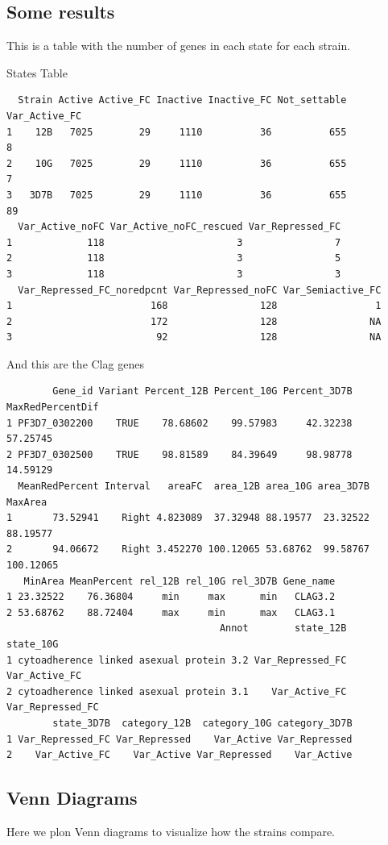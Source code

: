 \documentclass[11pt]{article}
\begin{document}
\subsection{Some results}
\label{sec:orgee930da}
This is a table with the number of genes in each state for each strain.

States Table
\begin{verbatim}
  Strain Active Active_FC Inactive Inactive_FC Not_settable Var_Active_FC
1    12B   7025        29     1110          36          655             8
2    10G   7025        29     1110          36          655             7
3   3D7B   7025        29     1110          36          655            89
  Var_Active_noFC Var_Active_noFC_rescued Var_Repressed_FC
1             118                       3                7
2             118                       3                5
3             118                       3                3
  Var_Repressed_FC_noredpcnt Var_Repressed_noFC Var_Semiactive_FC
1                        168                128                 1
2                        172                128                NA
3                         92                128                NA
\end{verbatim}

And this are the Clag genes
\begin{verbatim}
        Gene_id Variant Percent_12B Percent_10G Percent_3D7B MaxRedPercentDif
1 PF3D7_0302200    TRUE    78.68602    99.57983     42.32238         57.25745
2 PF3D7_0302500    TRUE    98.81589    84.39649     98.98778         14.59129
  MeanRedPercent Interval   areaFC  area_12B area_10G area_3D7B   MaxArea
1       73.52941    Right 4.823089  37.32948 88.19577  23.32522  88.19577
2       94.06672    Right 3.452270 100.12065 53.68762  99.58767 100.12065
   MinArea MeanPercent rel_12B rel_10G rel_3D7B Gene_name
1 23.32522    76.36804     min     max      min   CLAG3.2
2 53.68762    88.72404     max     min      max   CLAG3.1
                                     Annot        state_12B        state_10G
1 cytoadherence linked asexual protein 3.2 Var_Repressed_FC    Var_Active_FC
2 cytoadherence linked asexual protein 3.1    Var_Active_FC Var_Repressed_FC
        state_3D7B  category_12B  category_10G category_3D7B
1 Var_Repressed_FC Var_Repressed    Var_Active Var_Repressed
2    Var_Active_FC    Var_Active Var_Repressed    Var_Active
\end{verbatim}

\subsection{Venn Diagrams}
\label{sec:org02cbd66}
Here we plon Venn diagrams to visualize how the strains compare.
\end{document}
